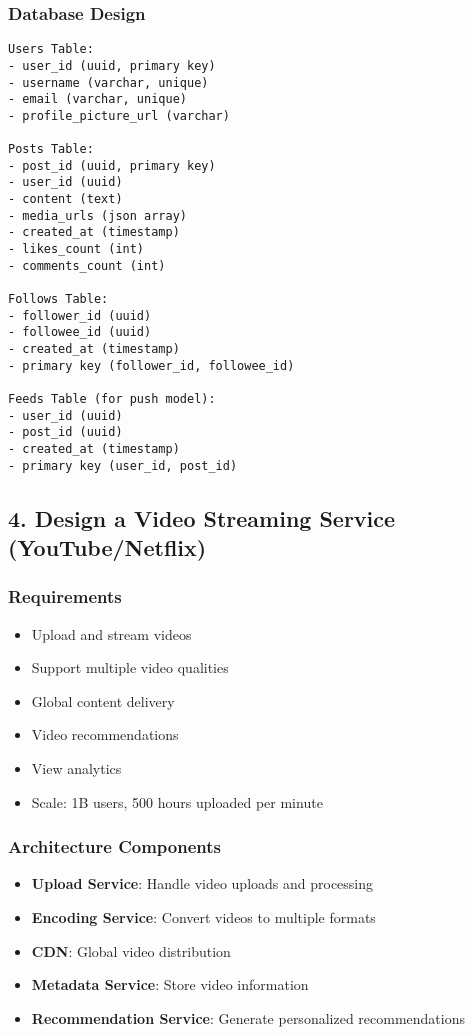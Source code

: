 \documentclass[10pt,a4paper]{article}
\begin{document}
\subsubsection{Database Design}
\begin{verbatim}
Users Table:
- user_id (uuid, primary key)
- username (varchar, unique)
- email (varchar, unique)
- profile_picture_url (varchar)

Posts Table:
- post_id (uuid, primary key)
- user_id (uuid)
- content (text)
- media_urls (json array)
- created_at (timestamp)
- likes_count (int)
- comments_count (int)

Follows Table:
- follower_id (uuid)
- followee_id (uuid)
- created_at (timestamp)
- primary key (follower_id, followee_id)

Feeds Table (for push model):
- user_id (uuid)
- post_id (uuid)
- created_at (timestamp)
- primary key (user_id, post_id)
\end{verbatim}

\subsection{4. Design a Video Streaming Service (YouTube/Netflix)}

\subsubsection{Requirements}
\begin{itemize}
\item Upload and stream videos
\item Support multiple video qualities
\item Global content delivery
\item Video recommendations
\item View analytics
\item Scale: 1B users, 500 hours uploaded per minute
\end{itemize}

\subsubsection{Architecture Components}
\begin{itemize}
\item \textbf{Upload Service}: Handle video uploads and processing
\item \textbf{Encoding Service}: Convert videos to multiple formats
\item \textbf{CDN}: Global video distribution
\item \textbf{Metadata Service}: Store video information
\item \textbf{Recommendation Service}: Generate personalized recommendations
\end{itemize}
\end{document}
